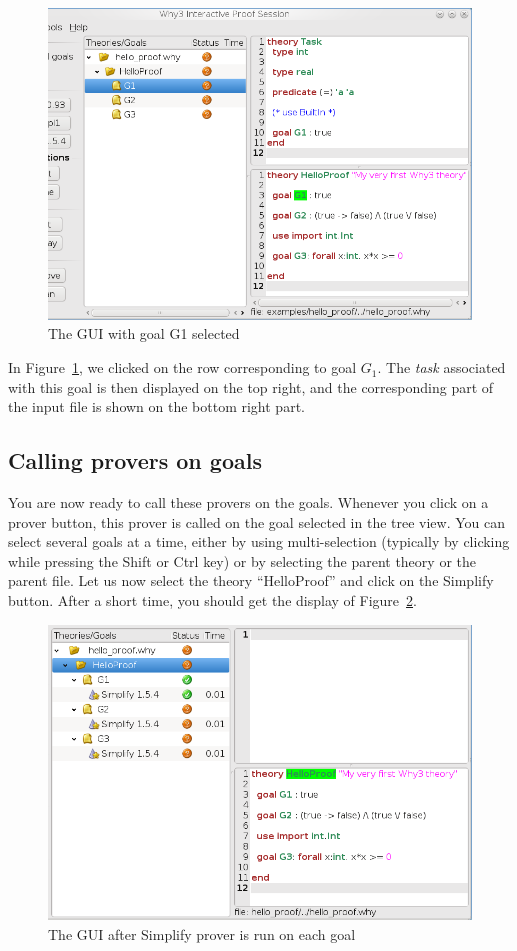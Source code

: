 \begin{figure}[tbp]
 \includegraphics[width=\textwidth]{gui-0-70-2.png}
  \caption{The GUI with goal G1 selected}
  \label{fig:gui2}
\end{figure}
In Figure~\ref{fig:gui2}, we clicked on the row corresponding to
goal $G_1$. The \emph{task} associated with this goal is then
displayed on the top right, and the corresponding part of the input
file is shown on the bottom right part.


\subsection{Calling provers on goals}

You are now ready to call these provers on the goals. Whenever you
click on a prover button, this prover is called on the goal selected
in the tree view. You can select several goals at a time, either
by using multi-selection (typically by clicking while pressing the
\textsf{Shift} or \textsf{Ctrl} key) or by selecting the parent theory
or the parent file. Let us now select the theory ``HelloProof'' and
click on the \textsf{Simplify} button. After a short time, you should
get the display of Figure~\ref{fig:gui3}.

\begin{figure}[tbp]
\includegraphics[width=\textwidth]{gui-0-70-3.png}
  \caption{The GUI after Simplify prover is run on each goal}
  \label{fig:gui3}
\end{figure}

